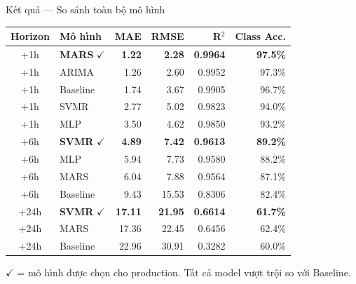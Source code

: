 \documentclass[aspectratio=169]{beamer}
\begin{document}
\begin{frame}{Kết quả --- So sánh toàn bộ mô hình}
  \centering
  \small
  \begin{tabular}{c l r r r r}
    \toprule
    \textbf{Horizon} & \textbf{Mô hình} & \textbf{MAE} & \textbf{RMSE} & \textbf{R$^2$} & \textbf{Class Acc.} \\
    \midrule
    \rowcolor{green!15}
    +1h & \textbf{MARS} $\checkmark$ & \textbf{1.22} & \textbf{2.28} & \textbf{0.9964} & \textbf{97.5\%} \\
    +1h & ARIMA      & 1.26 & 2.60 & 0.9952 & 97.3\% \\
    +1h & Baseline   & 1.74 & 3.67 & 0.9905 & 96.7\% \\
    +1h & SVMR       & 2.77 & 5.02 & 0.9823 & 94.0\% \\
    +1h & MLP        & 3.50 & 4.62 & 0.9850 & 93.2\% \\
    \midrule
    \rowcolor{green!15}
    +6h & \textbf{SVMR} $\checkmark$ & \textbf{4.89} & \textbf{7.42} & \textbf{0.9613} & \textbf{89.2\%} \\
    +6h & MLP        & 5.94 & 7.73 & 0.9580 & 88.2\% \\
    +6h & MARS       & 6.04 & 7.88 & 0.9564 & 87.1\% \\
    +6h & Baseline   & 9.43 & 15.53 & 0.8306 & 82.4\% \\
    \midrule
    \rowcolor{green!15}
    +24h & \textbf{SVMR} $\checkmark$ & \textbf{17.11} & \textbf{21.95} & \textbf{0.6614} & \textbf{61.7\%} \\
    +24h & MARS      & 17.36 & 22.45 & 0.6456 & 62.4\% \\
    +24h & Baseline  & 22.96 & 30.91 & 0.3282 & 60.0\% \\
    \bottomrule
  \end{tabular}
  \vspace{0.4em}
  \begin{alertblock}{}
    \centering $\checkmark$ = mô hình được chọn cho production. Tất cả model vượt trội so với Baseline.
  \end{alertblock}
\end{frame}
\end{document}
